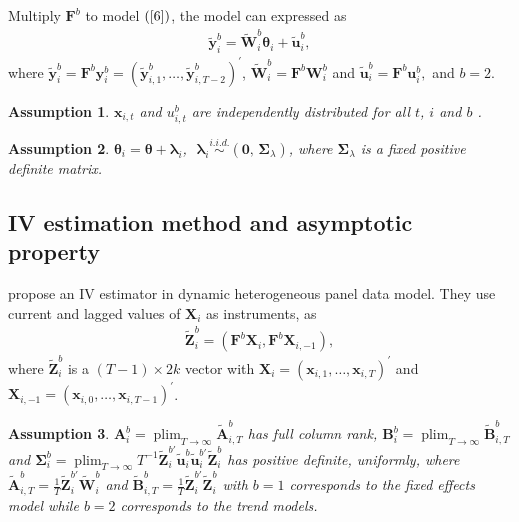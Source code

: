 \documentclass[12pt,a4paper,hyperref]{article}
\newtheorem{myAssu}{Assumption}
\DeclareMathOperator*{\plim}{plim}
\begin{document}
Multiply $\boldsymbol{F}^{b}$ to model $(\ref{6})$, the model can expressed as
\begin{align}
\tilde{\boldsymbol{y}}^{b}_{i}= \tilde{\boldsymbol{W}}^{b}_{i}\boldsymbol{\theta}_{i}+\tilde{\boldsymbol{u}}^{b}_{i}, \label{8}
\end{align}
where $\tilde{\boldsymbol{y}}^{b}_{i}=\boldsymbol{F}^{b}\boldsymbol{y}^{b}_{i}= \left(\tilde{\boldsymbol{y}}^{b}_{i,1}, \ldots, \tilde{\boldsymbol{y}}^{b}_{i,T-2} \right)^{'}$,  $\tilde{\boldsymbol{W}}^{b}_{i}=\boldsymbol{F}^{b}\boldsymbol{W}^{b}_{i}$ and $\tilde{\boldsymbol{u}}^{b}_{i}=\boldsymbol{F}^{b}\boldsymbol{u}^{b}_{i},$ and $b=2$.







\begin{myAssu}
$\boldsymbol{x}_{i,t}$ and $u^{b}_{i,t}$ are independently distributed for all $t$, $i$ and $b$ .
\end{myAssu}

\begin{myAssu}
$\boldsymbol{\theta}_{i}=\boldsymbol{\theta}+\boldsymbol{\lambda}_{i}$, \,\,$\boldsymbol{\lambda}_{i} \overset{i.i.d.}{\sim}(\boldsymbol{0},\, \boldsymbol{\Sigma}_{\lambda})$, where $\boldsymbol{\Sigma}_{\lambda}$ is a fixed positive definite matrix.
\end{myAssu}






\subsection{IV estimation method and asymptotic property}
\citet{Norkute:2019} propose an IV estimator in dynamic heterogeneous panel data model.
They use current and lagged values of $\boldsymbol{X}_{i}$ as instruments, as
\begin{align}
\tilde{\boldsymbol{Z}}^{b}_{i}=\left(\boldsymbol{F}^{b} \boldsymbol{X}_{i}, \boldsymbol{F}^{b} \boldsymbol{X}_{i,-1} \right),
\end{align}
where $\tilde{\boldsymbol{Z}}^{b}_{i}$ is a $(T-1) \times  2k$ vector with $\boldsymbol{X}_{i}=\left(\boldsymbol{x}_{i,1}, \ldots, \boldsymbol{x}_{i,T}  \right)^{'}$ and $\boldsymbol{X}_{i,-1}=\left(\boldsymbol{x}_{i,0}, \ldots, \boldsymbol{x}_{i,T-1}  \right)^{'}$. \\

\begin{myAssu}
$\boldsymbol{A}^{b}_{i}=\plim_{T \to \infty}\tilde{\boldsymbol{A}}^{b}_{i,T}$ has full column rank, $\boldsymbol{B}^{b}_{i}=\plim_{T \to \infty}\tilde{\boldsymbol{B}}^{b}_{i,T}$ and $\boldsymbol{\Sigma}^{b}_{i}=\plim_{T \to \infty} T^{-1}\tilde{\boldsymbol{Z}}^{b'}_{i}\tilde{\boldsymbol{u}}^{b}_{i} \tilde{\boldsymbol{u}}_{i}^{b'}\tilde{\boldsymbol{Z}}^{b}_{i}$ has positive definite, uniformly, where $\tilde{\boldsymbol{A}}^{b}_{i,T}= \frac{1}{T}\tilde{\boldsymbol{Z}}^{b'}_{i}\tilde{\boldsymbol{W}}^{b}_{i}$ and $\tilde{\boldsymbol{B}}^{b}_{i,T}= \frac{1}{T}\tilde{\boldsymbol{Z}}^{b'}_{i}\tilde{\boldsymbol{Z}}^{b}_{i}$
with $b = 1$ corresponds to the fixed effects model while $b = 2$ corresponds to the trend models.
\end{myAssu}
\end{document}
